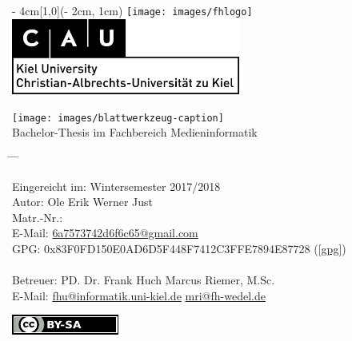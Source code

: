 
\begin{titlepage}
  \vspace*{20ex}
  \begin{textblock*}{\paperwidth - 4cm}[1,0](\paperwidth - 2cm, 1cm)
    \centering
    \texttt{[image: images/fhlogo]}
    \hfill
    \includegraphics[height=2.5cm]{images/logo-cau-kiel.png}
  \end{textblock*}
  \begin{center}
    \sffamily{}
    \texttt{[image: images/blattwerkzeug-caption]} \\[2ex]
    {Bachelor-Thesis im Fachbereich Medieninformatik}
  \end{center}
  \vspace*{10ex}
  \begin{tabbing}
    \hspace{8em} \= \hspace{14em} \= \hspace{8em} \= \kill

    Eingereicht im: \> Wintersemester 2017/2018 \\[5ex]
    Autor: \> Ole Erik Werner Just \\
    Matr.-Nr.:  \\
    E-Mail: \> \href{mailto:6a7573742d6f6c65@gmail.com}{6a7573742d6f6c65@gmail.com} \\
    GPG: 0x83F0FD150E0AD6D5F448F7412C3FFE7894E87728 (\ref{gpg})
    \\

    \\
    Betreuer: \> PD. Dr. Frank Huch \> Marcus Riemer, M.Sc. \\
    E-Mail: \> \href{mailto:fhu@informatik.uni-kiel.de}{fhu@informatik.uni-kiel.de} \> \href{mailto:mri@fh-wedel.de}{mri@fh-wedel.de}
  \end{tabbing}
  \vfill
  \centering \href{https://creativecommons.org/licenses/by-sa/4.0/}{\includegraphics{images/licenselogo}}
\end{titlepage}

\restoregeometry                 %

\cleardoublepage

